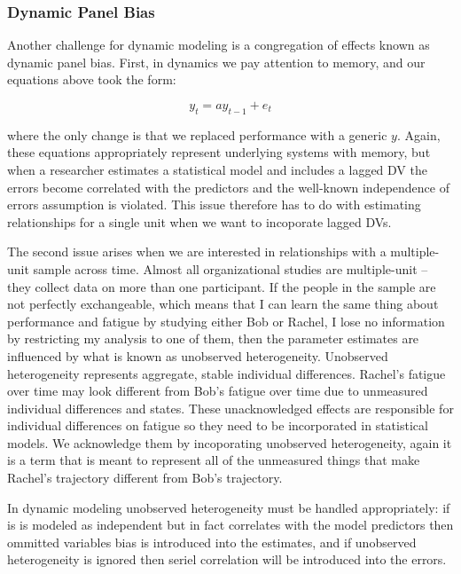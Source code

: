 \documentclass[english,,man]{apa6}
\theoremstyle{definition}
\theoremstyle{definition}
\theoremstyle{definition}
\theoremstyle{remark}
\begin{document}
\hypertarget{dynamic-panel-bias}{%
\subsubsection{Dynamic Panel Bias}\label{dynamic-panel-bias}}

Another challenge for dynamic modeling is a congregation of effects
known as dynamic panel bias. First, in dynamics we pay attention to
memory, and our equations above took the form:

\begin{equation}
y_{t} = a y_{t-1} + e_{t}
\end{equation}

\noindent where the only change is that we replaced performance with a
generic \(y\). Again, these equations appropriately represent underlying
systems with memory, but when a researcher estimates a statistical model
and includes a lagged DV the errors become correlated with the
predictors and the well-known independence of errors assumption is
violated. This issue therefore has to do with estimating relationships
for a single unit when we want to incoporate lagged DVs.

The second issue arises when we are interested in relationships with a
multiple-unit sample across time. Almost all organizational studies are
multiple-unit -- they collect data on more than one participant. If the
people in the sample are not perfectly exchangeable, which means that I
can learn the same thing about performance and fatigue by studying
either Bob or Rachel, I lose no information by restricting my analysis
to one of them, then the parameter estimates are influenced by what is
known as unobserved heterogeneity. Unobserved heterogeneity represents
aggregate, stable individual differences. Rachel's fatigue over time may
look different from Bob's fatigue over time due to unmeasured individual
differences and states. These unacknowledged effects are responsible for
individual differences on fatigue so they need to be incorporated in
statistical models. We acknowledge them by incoporating unobserved
heterogeneity, again it is a term that is meant to represent all of the
unmeasured things that make Rachel's trajectory different from Bob's
trajectory.

In dynamic modeling unobserved heterogeneity must be handled
appropriately: if is is modeled as independent but in fact correlates
with the model predictors then ommitted variables bias is introduced
into the estimates, and if unobserved heterogeneity is ignored then
seriel correlation will be introduced into the errors.
\end{document}
